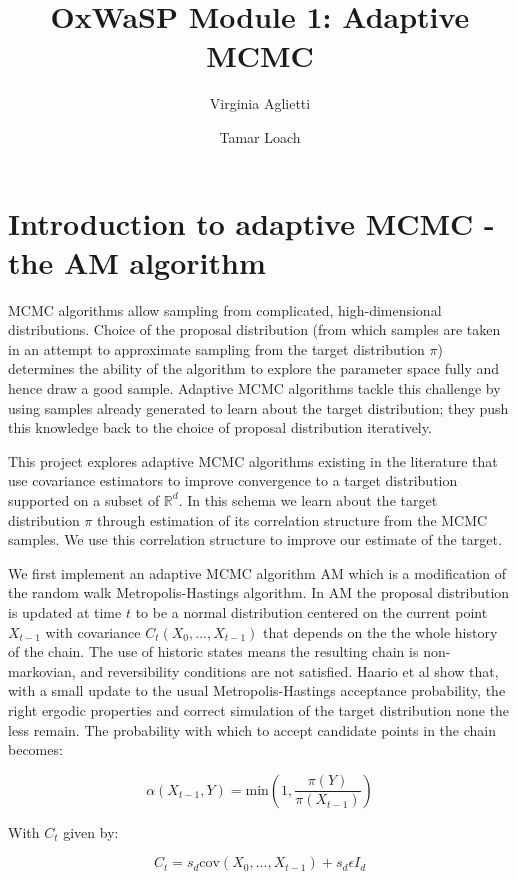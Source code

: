 \documentclass{article}
\title{OxWaSP Module 1: Adaptive MCMC}
\author{Virginia Aglietti \and Tamar Loach}
\begin{document}


\maketitle

\section{Introduction to adaptive MCMC - the AM algorithm}

MCMC algorithms allow sampling from complicated, high-dimensional distributions. Choice of the proposal distribution (from which samples are taken in an attempt to approximate sampling from the target distribution $\pi$) determines the ability of the algorithm to explore the parameter space fully and hence draw a good sample. Adaptive MCMC algorithms tackle this challenge by using samples already generated to learn about the target distribution; they push this knowledge back to the choice of proposal distribution iteratively.

This project explores adaptive MCMC algorithms existing in the literature that use covariance estimators to improve convergence to a target distribution supported on a subset of $\mathbb{R}^d$. In this schema we learn about the target distribution $\pi$ through estimation of its correlation structure from the MCMC samples. We use this correlation structure to improve our estimate of the target.

We first implement an adaptive MCMC algorithm AM \citep{haario2001} which is a modification of the random walk Metropolis-Hastings algorithm. In AM the proposal distribution is updated at time $t$ to be a normal distribution centered on the current point $X_{t-1}$ with covariance $C_t(X_0, ..., X_{t-1})$ that depends on the the whole history of the chain. The use of historic states means the resulting chain is non-markovian, and reversibility conditions are not satisfied. Haario et al show that, with a small update to the usual Metropolis-Hastings acceptance probability, the right ergodic properties and correct simulation of the target distribution none the less remain. The probability with which to accept candidate points in the chain becomes:

$$
\alpha(X_{t-1},Y) = \text{min}\left( 1,\frac{\pi(Y)}{\pi(X_{t-1})}\right)
$$

With $C_t$ given by:

$$
C_t = s_d \text{cov}(X_0, ..., X_{t-1}) + s_d\epsilon I_d
$$
\end{document}
